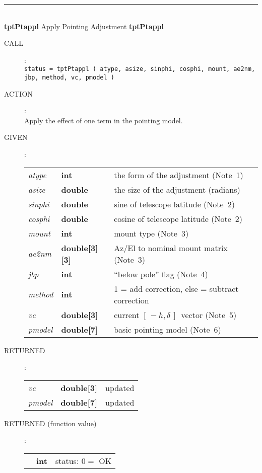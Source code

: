 \documentclass[12pt,fleqn,twoside]{article}
\renewcommand{\_}{{\tt\char'137}}     %
\newcommand{\mhadec}     {$[\,-h,\delta\,]$}
\newcommand{\routine}[2]
{
  \newpage
  \rule{\textwidth}{0.3mm}\\ \nopagebreak
  {\Large {\bf #1} \hfill #2 \hfill {\bf #1}}
  \vspace{-1ex}
}
\newcommand{\call}[1]
{
  \goodbreak
  \begin{description}
    \item[CALL]: \\[0.5ex] \nopagebreak
        {\tt #1}
  \end{description}
  \vspace{-3ex}
}
\newcommand{\action}[1]
{
  \goodbreak
  \begin{description}
    \item[ACTION]: \\[0.5ex] \nopagebreak
        #1
  \end{description}
  \vspace{-3ex}
}
\newcommand{\args}[2]
{
  \goodbreak
  \begin{description}
  \item[#1]: \\[1.5ex] \nopagebreak
    \hspace*{-0.9em}
    \begin{tabular}{p{4.5em}p{5.8em}p{23.5em}}
      #2
    \end{tabular}
  \end{description}
  \vspace{-3ex}
}
\newcommand{\spec}[3]
{
  {\em {#1}} & {\bf \mbox{#2}} & {#3}
}
\begin{document}
\routine{tptPtappl}{Apply Pointing Adjustment}
\label{tptPtappl}
\call{status = tptPtappl ( atype, asize, sinphi, cosphi, mount, ae2nm, \\
            \hspace*{10em} jbp, method, vc, pmodel )}
\action{Apply the effect of one term in the pointing model.}
\args{GIVEN}
{
\spec{atype}{int}{the form of the adjustment (Note~1)} \\
\spec{asize}{double}{the size of the adjustment (radians)} \\
\spec{sinphi}{double}{sine of telescope latitude (Note~2)} \\
\spec{cosphi}{double}{cosine of telescope latitude (Note~2)} \\
\spec{mount}{int}{mount type (Note~3)} \\
\spec{ae2nm}{double[3][3]}{Az/El to nominal mount matrix (Note~3)} \\
\spec{jbp}{int}{``below pole'' flag (Note~4)} \\
\spec{method}{int}{1 = add correction, else = subtract correction} \\
\spec{vc}{double[3]}{current \mhadec\ vector (Note~5)} \\
\spec{pmodel}{double[7]}{basic pointing model (Note~6)}
}
\args{RETURNED}
{
\spec{vc}{double[3]}{updated} \\
\spec{pmodel}{double[7]}{updated}
}
\args{RETURNED \rm (function value)}
{
\spec{}{int}{status: $0 =$ OK}
}
\end{document}
